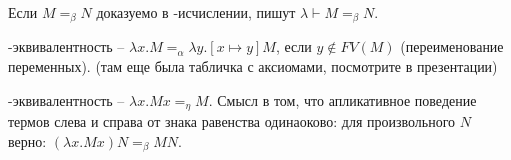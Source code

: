 Если $M =_{\beta} N$ доказуемо в \lambda-исчислении, пишут $\lambda \vdash M =_{\beta} N$.

\begin{definition}
    \alpha-эквивалентность -- $\lambda x. M =_{\alpha} \lambda y. [x \mapsto y] M$, если $y \notin FV(M)$ (переименование переменных). (там еще была табличка с аксиомами, посмотрите в презентации) 
\end{definition}

\begin{definition}
    \eta-эквивалентность -- $\lambda x. M x =_{\eta} M$. Смысл в том, что апликативное поведение термов слева и справа от знака равенства одинаоково: для произвольного $N$ верно: $(\lambda x. M x)N =_{\beta} MN$.
\end{definition}

